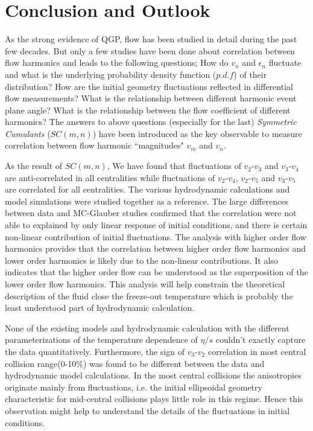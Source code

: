 

\chapter{Conclusion and Outlook}

As the strong evidence of QGP, flow has been studied in detail during the past few decades. But only a few studies have been done about correlation between flow harmonics and leads to the following questions; How do $v_n$ and $\epsilon_n$ fluctuate and what is the underlying probability density function ($p.d.f$) of their distribution? How are the initial geometry fluctuations reflected in differential flow measurements? What is the relationship between different harmonic event plane angle? What is the relationship between the flow coefficient of different harmonics? The answers to above questions (especially for the last) \textit{Symmetric Cumulants} ($SC(m,n)$) have been introduced as the key observable to measure correlation between flow harmonic ``magnitudes" $v_m$ and $v_n$.



As the result of $SC(m,n)$, We have found that fluctuations of $v_2$-$v_3$ and $v_3$-$v_4$ are anti-correlated in all centralities while fluctuations of $v_2$-$v_4$, $v_2$-$v_5$ and $v_3$-$v_5$ are correlated for all centralities. The various hydrodynamic calculations and model simulations were studied together as a reference. The large differences between data and MC-Glauber studies confirmed that the correlation were not able to explained by only linear response of initial conditions, and there is certain non-linear contribution of initial fluctuations. The analysis with higher order flow harmonics provides that the correlation between higher order flow harmonics and lower order harmonics is likely due to the non-linear contributions. It  also indicates that the higher order flow can be understood as the superposition of the lower order flow harmonics. This analysis will help constrain the theoretical description of the fluid close the freeze-out temperature which is probably the least understood part of hydrodynamic calculation. \cite{Teaney:2012ke} \cite{Yan:2015dh}

 None of the existing models and hydrodynamic calculation with the different parameterizations of the temperature dependence of $\eta/s$ couldn't exactly capture the data quantitatively. Furthermore, the sign of $v_3$-$v_2$ correlation in most central collision range(0-10\%) was found to be different between the data and hydrodynamic model calculations.  In the most central collisions the anisotropies originate mainly from fluctuations, i.e. the initial ellipsoidal geometry characteristic for mid-central collisions plays little role in this regime.  Hence this observation might help to understand the details of the fluctuations in initial conditions.
 
